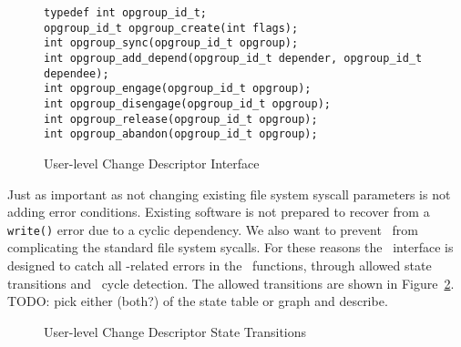 \begin{figure}[htb]
\begin{scriptsize}
\texttt{typedef int opgroup\_id\_t;}\\
\texttt{opgroup\_id\_t opgroup\_create(int flags);}\\
\texttt{int opgroup\_sync(opgroup\_id\_t opgroup);}\\
\texttt{int opgroup\_add\_depend(opgroup\_id\_t depender, opgroup\_id\_t dependee);}\\
\texttt{int opgroup\_engage(opgroup\_id\_t opgroup);}\\
\texttt{int opgroup\_disengage(opgroup\_id\_t opgroup);}\\
\texttt{int opgroup\_release(opgroup\_id\_t opgroup);}\\
\texttt{int opgroup\_abandon(opgroup\_id\_t opgroup);}
\end{scriptsize}
\caption{\label{fig:opgroup-interface} User-level Change Descriptor Interface}
\end{figure}

Just as important as not changing existing file system syscall
parameters is not adding error conditions. Existing software is not
prepared to recover from a \texttt{write()} error due to a cyclic
dependency. We also want to prevent \opgroups\ from complicating the
standard file system sycalls. For these reasons the \opgroup\
interface is designed to catch all \opgroup{}-related errors in the
\opgroup\ functions, through allowed state transitions and
\opgroupAddDepend\ cycle detection. The allowed transitions are shown
in Figure~\ref{fig:opgroup-transitions}. TODO: pick either (both?) of
the state table or graph and describe.

\begin{figure}[htb]
\caption{\label{fig:opgroup-transitions} User-level Change Descriptor State Transitions}
\end{figure}

